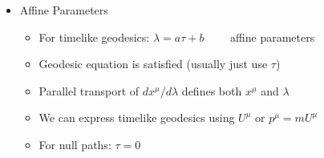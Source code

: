 \begin{itemize}
\begin{itemize}
\begin{itemize}
        \end{itemize}

      \item So, we can find the stationary points of:

        $$I=\frac{1}{2}\int f\,d\tau=\frac{1}{2}\int g_{\mu\nu}\frac{dx^{\mu}}{d\tau}\frac{dx^{\nu}}{d\tau d\tau$$

        \item We can use the Euler-Lagrange, or just directly calculate variation:

          $$x^{\mu}\to x^{\mu}+\delta x^{\mu}$$
          $$\Rightarrow g_{\mu\nu}\to g_{\mu\nu}+(\partial_{\sigma}g_{\mu\nu})\delta x^{\sigma}$$
          $$\delta I=I_{new}-I_{old}$$

        \item Bringing all of our terms together, we get:

        $$\delta I=-\int\left[ g_{\mu\sigma}\frac{d^2x^{\mu}}{d\tau^2}+\frac{1}{2}(\partial_{\mu}g_{\nu\sigma}+\partial_{\nu}g_{\sigma\mu}-\partial_{\sigma} g_{\mu\nu}})\frac{dx^{\mu}}{d\tau}\frac{dx^{\nu}}{d\tau} \right]\delta x^{\sigma}\,d\tau$$

        \item Our final form takes:

          $$\frac{d^2x^{\rho}}{d\tau^2}+\underbrace{\frac{1}{2}g^{\rho\sigma}(\partial_{\mu}g_{\nu\sigma}+\partial_{\nu}g_{\sigma\mu}-\partial_{\sigma}g_{\mu\nu})\frac{dx^{\mu}}{d\tau}}_{\Gamma^{\rho}_{\mu\nu}}\frac{dx^{\nu}}{d\tau}=0$$

    \end{itemize}

  \item Affine Parameters

    \begin{itemize}

      \item For timelike geodesics: $\lambda=a\tau+b\quad\quad$ affine parameters

      \item Geodesic equation is satisfied (usually just use $\tau$)

      \item Parallel transport of $dx^{\mu}/d\lambda$ defines both $x^{\mu}$ and $\lambda$

      \item We can express timelike geodesics using $U^{\mu}$ or $p^{\mu}=mU^{\mu}$

      \item For null paths: $\tau=0$


\end{itemize}
\end{itemize}
